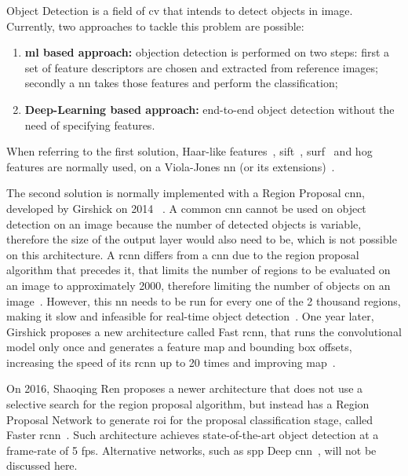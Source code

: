 Object Detection is a field of \acl{cv} that intends to detect objects in image. Currently, two approaches to tackle this problem are possible:

\begin{enumerate}
	\item \textbf{\acl{ml} based approach:} objection detection is performed on two steps: first a set of feature descriptors are chosen and extracted from reference images; secondly a \acl{nn} takes those features and perform the classification;
	\item \textbf{Deep-Learning based approach:} end-to-end object detection without the need of specifying features.
\end{enumerate}

When referring to the first solution, Haar-like features~\cite{Messom2006}, \ac{sift}~\cite{Hughes2011a}, \ac{surf}~\cite{Bay2008} and \ac{hog}~\cite{Dalal2010, Surasak2018} features are normally used, on a Viola-Jones \ac{nn} (or its extensions)~\cite{Viola2001, ViolaP2004}. %

The second solution is normally implemented with a Region Proposal \acf{cnn}, developed by Girshick on 2014 \etal~\cite{Girshick2014}. A common \ac{cnn} cannot be used on object detection on an image because the number of detected objects is variable, therefore the size of the output layer would also need to be, which is not possible on this architecture. A \ac{rcnn} differs from a \ac{cnn} due to the region proposal algorithm that precedes it, that limits the number of regions to be evaluated on an image to approximately 2000, therefore limiting the number of objects on an image~\cite{Girshick2014}. However, this \acl{nn} needs to be run for every one of the 2 thousand regions, making it slow and infeasible for real-time object detection~\cite{Girshick2014}. One year later, Girshick proposes a new architecture called Fast \ac{rcnn}, that runs the convolutional model only once and generates a feature map and bounding box offsets, increasing the speed of its \ac{rcnn} up to 20 times and improving \ac{map}~\cite{Girshick2015}. 

On 2016, Shaoqing Ren \etal proposes a newer architecture that does not use a selective search for the region proposal algorithm, but instead has a Region Proposal Network to generate \ac{roi} for the proposal classification stage, called Faster \ac{rcnn}~\cite{Ren2017}. Such architecture achieves state-of-the-art object detection at a frame-rate of 5 \ac{fps}. Alternative networks, such as \ac{spp} Deep \acl{cnn}~\cite{He2015}, will not be discussed here.

